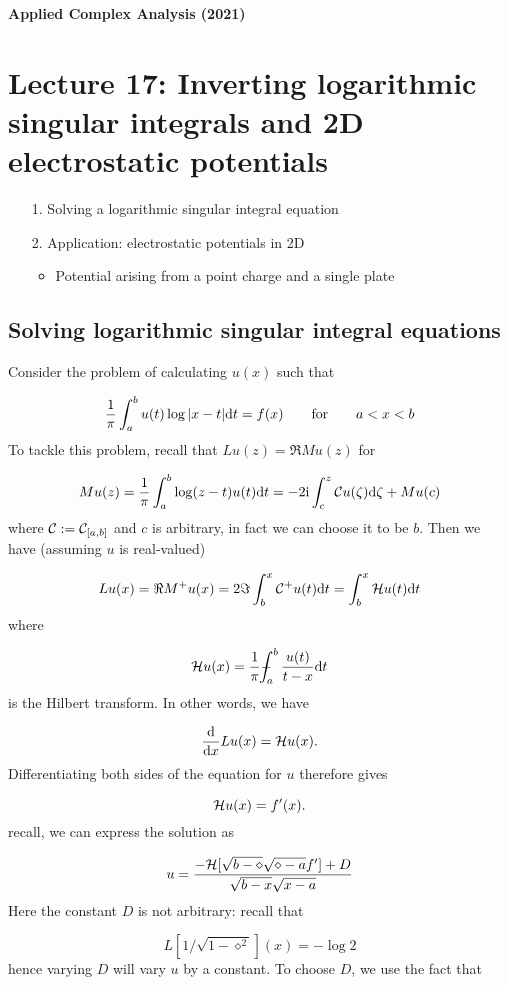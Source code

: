 \documentclass[12pt,a4paper]{article}
\def\qqfor{\qquad\hbox{for}\qquad}
\def\D{ {\rm d} }
\def\I{ {\rm i} }
\def\CC{ {\cal C} }
\def\HH{ {\cal H} }
\def\Xint#1{ \mathchoice
   {\XXint\displaystyle\textstyle{#1} }%
   {\XXint\textstyle\scriptstyle{#1} }%
   {\XXint\scriptstyle\scriptscriptstyle{#1} }%
   {\XXint\scriptscriptstyle\scriptscriptstyle{#1} }%
   \!\int}
\def\XXint#1#2#3{ {\setbox0=\hbox{$#1{#2#3}{\int}$}
     \vcenter{\hbox{$#2#3$}}\kern-.5\wd0} }
\def\dashint{\Xint-}
\def\dx{\D x}
\def\dt{\D t}
\begin{document}
\textbf{Applied Complex Analysis (2021)}

\section{Lecture 17: Inverting logarithmic singular integrals and 2D electrostatic potentials}
\begin{itemize}
\item[1. ] Solving a logarithmic singular integral equation


\item[2. ] Application: electrostatic potentials in 2D

\begin{itemize}
\item Potential arising from a point charge and a single plate

\end{itemize}
\end{itemize}
\subsection{Solving logarithmic singular integral equations}
Consider the problem of calculating $u(x)$ such that

\[
{1 \over \pi} \int_a^b u(t) \log | x-t| \dt = f(x) \qqfor a < x < b
\]
To tackle this problem, recall that $L u(z) = \Re M u(z)$ for

\[
M u(z) = {1 \over \pi} \int_a^b \log(z-t) u(t) \D t =  -2 \I \int_c^z \CC u(\zeta) \D \zeta + M u(c)
\]
where  $\CC := \CC_{[a, b]}$ and  $c$ is arbitrary, in fact we can choose it to be $b$. Then we have (assuming $u$ is real-valued)

\[
L u(x) =  \Re M^+ u(x) = 2\Im \int_b^x \CC^+ u(t) \D t =  \int_b^x \HH u(t) \D t
\]
where

\[
\HH u(x) = {1 \over \pi} \dashint_a^b {u(t) \over t -x } \D t
\]
is the Hilbert transform. In other words, we have

\[
{\D \over \dx} L u(x) = \HH u(x).
\]
Differentiating both sides of the equation for $u$ therefore gives

\[
\HH u(x) = f'(x).
\]
recall, we can express the solution as

\[
    u = {-\HH[\sqrt{b-\diamond}\sqrt{\diamond-a} f'] + D \over \sqrt{b-x}\sqrt{x-a}}
\]
Here the constant $D$ is not arbitrary: recall that

\[
L[1/\sqrt{1-\diamond^2}](x) = - \log 2
\]
hence varying $D$ will vary $u$ by a constant. To choose $D$,  we use the fact that
\end{document}
